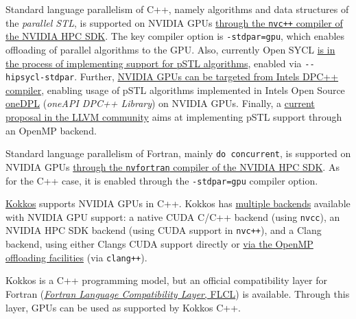  Standard language parallelism of C++, namely algorithms and data structures of the \emph{parallel STL}, is supported on NVIDIA GPUs \href{https://docs.nvidia.com/hpc-sdk/compilers/c++-parallel-algorithms/index.html}{through the \texttt{nvc++} compiler of the NVIDIA HPC SDK}. The key compiler option is \texttt{-stdpar=gpu}, which enables offloading of parallel algorithms to the GPU. Also, currently Open SYCL \href{https://github.com/OpenSYCL/OpenSYCL/pull/1088}{is in the process of implementing support for pSTL algorithms}, enabled via \texttt{-\/-hipsycl-stdpar}. Further, \href{https://intel.github.io/llvm-docs/GetStartedGuide.html\#build-dpc-toolchain-with-support-for-nvidia-cuda}{NVIDIA GPUs can be targeted from Intel\textquotesingle s DPC++ compiler}, enabling usage of pSTL algorithms implemented in Intel\textquotesingle s Open Source \href{https://github.com/oneapi-src/oneDPL}{oneDPL} (\emph{oneAPI DPC++ Library}) on NVIDIA GPUs. Finally, a \href{https://discourse.llvm.org/t/rfc-openmp-offloading-backend-for-c-parallel-algorithms/73468}{current proposal in the LLVM community} aims at implementing pSTL support through an OpenMP backend.   

 Standard language parallelism of Fortran, mainly \texttt{do\ concurrent}, is supported on NVIDIA GPUs \href{https://developer.nvidia.com/blog/accelerating-fortran-do-concurrent-with-gpus-and-the-nvidia-hpc-sdk/}{through the \texttt{nvfortran} compiler of the NVIDIA HPC SDK}. As for the C++ case, it is enabled through the \texttt{-stdpar=gpu} compiler option.   

 \href{https://github.com/kokkos/kokkos}{Kokkos} supports NVIDIA GPUs in C++. Kokkos has \href{https://kokkos.github.io/kokkos-core-wiki/requirements.html}{multiple backends} available with NVIDIA GPU support: a native CUDA C/C++ backend (using \texttt{nvcc}), an NVIDIA HPC SDK backend (using CUDA support in \texttt{nvc++}), and a Clang backend, using either Clang\textquotesingle s CUDA support directly or \href{https://docs.nersc.gov/development/programming-models/kokkos/}{via the OpenMP offloading facilities} (via \texttt{clang++}).   

 Kokkos is a C++ programming model, but an official compatibility layer for Fortran (\href{https://github.com/kokkos/kokkos-fortran-interop}{\emph{Fortran Language Compatibility Layer}, FLCL}) is available. Through this layer, GPUs can be used as supported by Kokkos C++.   

